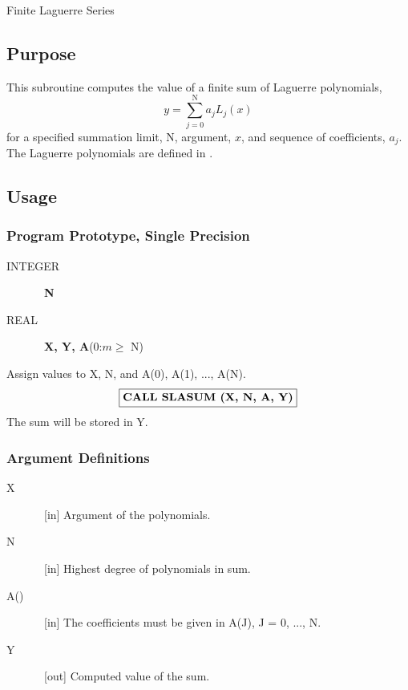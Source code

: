 \documentclass[twoside]{MATH77}
\begin{document}
 Finite Laguerre Series


\subsection{Purpose}

This subroutine computes the value of a finite sum of Laguerre polynomials,%
\begin{equation*}
y=\sum_{j=0}^{\text{N}}a_jL_j(x)
\end{equation*}
for a specified summation limit, N, argument, $x$, and sequence of
coefficients, $a_j$. The Laguerre polynomials are defined in
\cite{ams55:or-poly}.

\subsection{Usage}

\subsubsection{Program Prototype, Single Precision}

\begin{description}
\item[INTEGER]  \ {\bf N}

\item[REAL]  \ {\bf X, Y, A}(0:$m\geq $ N)
\end{description}

Assign values to X, N, and A(0), A(1), ..., A(N).
$$
\fbox{{\bf CALL SLASUM (X, N, A, Y)}}
$$
The sum will be stored in Y.

\subsubsection{Argument Definitions}

\begin{description}
\item[X]  \ [in] Argument of the polynomials.

\item[N]  \ [in] Highest degree of polynomials in sum.

\item[A()]  \ [in] The coefficients must be given in A(J), J = 0, ..., N.

\item[Y]  \ [out] Computed value of the sum.
\end{description}
\end{document}
